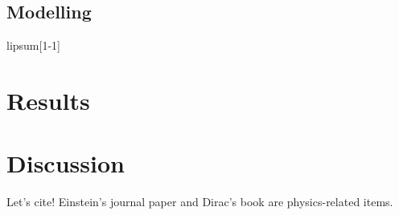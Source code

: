\documentclass{article}
\begin{document}
    \lipsum[1-1]

    \subsection{Modelling}

        lipsum[1-1]

\section{Results}

    \lipsum[1-1]

\section{Discussion}

    \lipsum[1-1]

Let's cite! Einstein's journal paper \cite{einstein} and Dirac's
book \cite{dirac} are physics-related items. 

\printbibliography %
\end{document}
